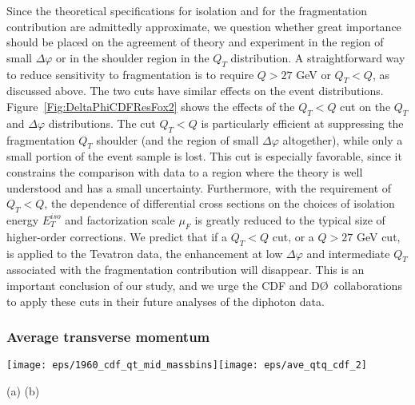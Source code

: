\documentclass[12pt,english,aps,preprint,prd,letterpaper,fleqn,nofootinbib,showpacs,showkeys,tightenlines,floatfix]{revtex4}
\begin{document}
Since the theoretical specifications for isolation and for the fragmentation
contribution are admittedly approximate, we question whether great
importance should be placed on the agreement of theory and experiment
in the region of small $\Delta\varphi$ or in the shoulder
region in the $Q_{T}$ distribution. A straightforward way to reduce
sensitivity to fragmentation is to require $Q>27$ GeV or $Q_{T}<Q$, 
as discussed above.  The two cuts have similar effects on the event
distributions. Figure~\ref{Fig:DeltaPhiCDFResFox2} shows the effects
of the $Q_{T}<Q$ cut on the $Q_{T}$ and $\Delta\varphi$ distributions.
The cut $Q_{T}<Q$ is particularly efficient at suppressing the fragmentation
$Q_{T}$ shoulder (and the region of small $\Delta\varphi$
altogether), while only a small portion of the event sample is lost.
This cut is especially favorable, since it constrains the comparison
with data to a region where the theory is well understood and has
a small uncertainty. Furthermore, with the requirement of $Q_{T}<Q$,
the dependence of differential cross sections on the choices of isolation
energy $E_{T}^{iso}$ and factorization scale $\mu_{F}$ is greatly
reduced to the typical size of higher-order corrections. We predict
that if a $Q_{T}<Q$ cut, or a $Q>27$ GeV cut, is applied to the
Tevatron data, the enhancement at low $\Delta\varphi$ and intermediate
$Q_{T}$ associated with the fragmentation contribution will disappear.
This is an important conclusion of our study, and we urge the CDF
and D\O\, collaborations to apply these cuts in their future analyses
of the diphoton data.


\subsubsection{Average transverse momentum \label{subsubsection:AverageQT}}

\begin{figure*}
\texttt{[image: eps/1960\_cdf\_qt\_mid\_massbins]}\texttt{[image: eps/ave\_qtq\_cdf\_2]}

\begin{centering}(a) \hspace{0.45\columnwidth} (b) \par\end{centering}

\caption{(a) Resummed transverse momentum distributions of photon pairs in
various invariant mass bins used in the CDF measurement, normalized
to the total cross section in each $Q$ bin. (b) The average $Q_{T}$
as a function of the $\gamma\gamma$ invariant mass, computed for
$Q_{T}<Q$. }

\label{Fig:QTMassBinsCDF} 
\end{figure*}
\end{document}
